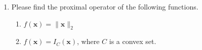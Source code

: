\documentclass[11pt,letter,notitlepage]{article}
\begin{document}
\begin{exercise}
\begin{enumerate}
\begin{enumerate}
  \end{enumerate}
  \item Please find the proximal operator of the following functions. \begin{enumerate}
          \item  $f(\mathbf{x})=\|\mathbf{x}\|_2$
          
          \item  $f(\mathbf{x})=I_C(\mathbf{x})$, where $C$ is a convex set.
        \end{enumerate}


\end{enumerate}
\end{exercise}
\begin{solution}

\end{solution}
\clearpage{$ $}
\end{document}

